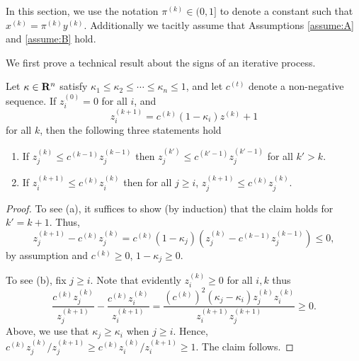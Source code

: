 \documentclass[11pt]{article}
\begin{document}

In this section, we use the notation $\pi^{(k)} \in (0, 1]$ to denote
  a constant such that $x^{(k)} = \pi^{(k)} y^{(k)}$. Additionally we tacitly assume that
  Assumptions \ref{assume:A} and \ref{assume:B} hold.

We first prove a technical result about the signs of an iterative process. 
\begin{lem}\label{lem:process-signs}
  Let $\kappa \in \mathbf{R}^n$ satisfy $\kappa_1 \leq \kappa_2 \leq \cdots \leq \kappa_n \leq 1$, and let
  $c^(t)$ denote a non-negative sequence. If $z^{(0)}_i = 0$ for all $i$, and
  \[
  z^{(k + 1)}_i = c^{(k)} (1 - \kappa_i) z^{(k)} + 1
  \]
  for all $k$, then the following three statements hold
  \begin{enumerate}
  \item If $z_j^{(k)} \leq c^{(k - 1)}z_j^{(k - 1)}$ then $z_j^{(k')} \leq c^{(k' - 1)}z_j^{(k' - 1)}$ for all $k ' > k$.
  \item If $z_i^{(k + 1)} \leq c^{(k)}z_i^{(k)}$ then for all $j \geq i$, $z_j^{(k + 1)} \leq c^{(k)}z_j^{(k)}$. 
  \end{enumerate}
  \begin{proof}
    To see (a), it suffices to show (by induction) that the claim holds for $k' = k + 1$. Thus,
    \[
    z_j^{(k + 1)} - c^{(k)} z_j^{(k)} = c^{(k)}(1 - \kappa_j)\left(z_j^{(k)} -c^{(k - 1)}z_j^{(k - 1)}\right) \leq 0,
    \]
    by assumption and $c^{(k)} \geq 0$, $1-\kappa_j\geq 0$.

    To see (b), fix $j \geq i$. Note that evidently $z_i^{(k)} \geq 0$ for all $i, k$ thus
    \[
    \frac{c^{(k)} z_j^{(k)}}{z_j^{(k + 1)}} - \frac{c^{(k)}z_i^{(k)}}{z_i^{(k + 1)}}
    = \frac{(c^{(k)})^2 ( \kappa_j - \kappa_i) z_j^{(k)} z_i^{(k)}}{z_i^{(k + 1)}z_j^{(k +1)}}
    \geq 0.
    \]
    Above, we use that $\kappa_j \geq \kappa_i$ when $j \geq i$. 
    Hence, $c^{(k)}z_j^{(k)}/z_j^{(k + 1)} \geq c^{(k)}z_i^{(k)}/z_i^{(k + 1)} \geq 1$. The claim follows. 
  \end{proof}
\end{lem}  
\end{document}
